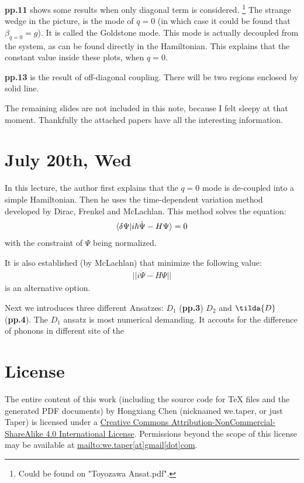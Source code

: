 \documentclass{article}
\numberwithin{equation}{subsection} %
\theoremstyle{definition}
\begin{document}
\textbf{pp.11} shows some results when only diagonal term
is considered.
\footnote{Could be found on "Toyozawa Ansat.pdf".}
The strange wedge
in the picture, is the mode of $q=0$ 
(in which case it could be found that $\beta_{q=0} = g$). 
It is
called the Goldstone mode. This mode is actually decoupled from 
the system, as can be found directly in the Hamiltonian. This explains
that the constant value inside these plots, when $q=0$.

\textbf{pp.13} is the result of off-diagonal coupling. 
There will be two regions enclosed by solid line.

The remaining slides are not included in this note,
because I felt sleepy at that moment. Thankfully the
attached papers have all the interesting information.
\section{July 20th, Wed}
\label{sec:July_20th_Wed}
In this lecture, the author first explains that the $q=0$ mode is
de-coupled into a simple Hamiltonian. Then he uses the time-dependent
variation method developed by Dirac, Frenkel and McLachlan. This method
solves the equation:
\begin{align}
    \label{eq:}
    \braket{\delta \Psi| i\hbar \dot{\Psi} - H\Psi} = 0
\end{align}
with the constraint of $\Psi$ being normalized.

It is also established (by McLachlan) that minimize the following
value:
\begin{align}
    \label{eq:July_20th_Wed}
    ||i\dot{\Psi}-H\Psi||
\end{align}
is an alternative option.

Next we introduces three different Ansatzes: $D_1$ (\textbf{pp.3})
$D_2$ and $\tilda{D}$ (\textbf{pp.4}). The $D_1$ ansatz is most
numerical demanding. It accouts for the difference of phonons in
different site of the 
\section{License}
The entire content of this work (including the source code
for TeX files and the generated PDF documents) by 
Hongxiang Chen (nicknamed we.taper, or just Taper) is
licensed under a 
\href{http://creativecommons.org/licenses/by-nc-sa/4.0/}{Creative 
Commons Attribution-NonCommercial-ShareAlike 4.0 International 
License}. Permissions beyond the scope of this 
license may be available at \url{mailto:we.taper[at]gmail[dot]com}.
\end{document}

